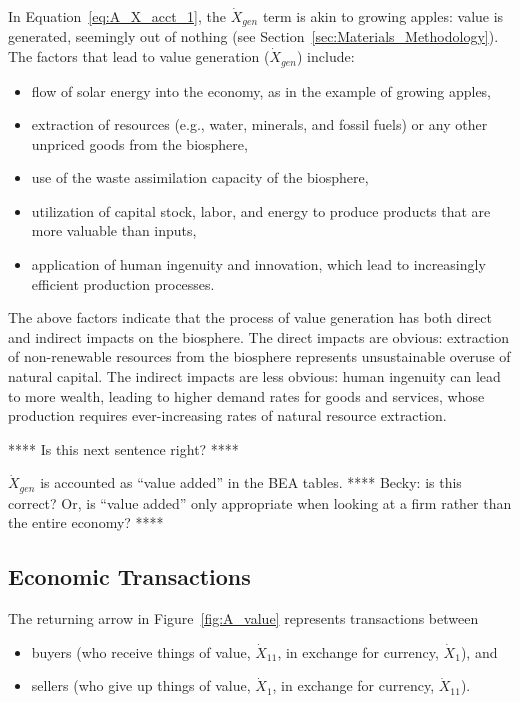 \noindent In Equation~\ref{eq:A_X_acct_1}, 
the $\dot{X}_{gen}$ term is akin to growing apples: 
value is generated, seemingly out of nothing
(see Section~\ref{sec:Materials_Methodology}).
The factors that lead to value generation 
($\dot{X}_{gen}$) include:

\begin{itemize}
	\item{flow of solar energy 
	into the economy,
	as in the example of growing apples,}
	\item{extraction of resources (e.g., water, minerals, and
	fossil fuels) or any other unpriced goods from the biosphere,}
	\item{use of the waste assimilation capacity of the biosphere,}
	\item{utilization of capital stock, labor, and energy to produce products
	that are more valuable than inputs,}
	\item{application of human ingenuity 
	and innovation, 
	which lead to increasingly efficient production processes.}
\end{itemize}

The above factors indicate that the process of value generation
has both direct and indirect impacts on the biosphere.
The direct impacts are obvious: 
extraction of non-renewable resources from the biosphere 
represents unsustainable overuse of natural capital.
The indirect impacts are less obvious: 
human ingenuity can lead to more wealth,
leading to higher demand rates for goods and services, 
whose production requires ever-increasing rates of natural resource extraction.

**** Is this next sentence right? ****

$\dot{X}_{gen}$ is accounted as ``value added'' in the BEA tables.
**** Becky: is this correct? Or, is ``value added'' only appropriate when 
looking at a firm rather than the entire economy? ****



\subsection{Economic Transactions}

The returning arrow in Figure~\ref{fig:A_value} 
represents transactions between 
\begin{itemize}
	\item{buyers (who receive things of value, $\dot{X}_{11}$,
	in exchange for currency, $\dot{X}_{1}$), and}
	\item{sellers (who give up things of value, $\dot{X}_{1}$,
	in exchange for currency, $\dot{X}_{11}$).}
\end{itemize}

